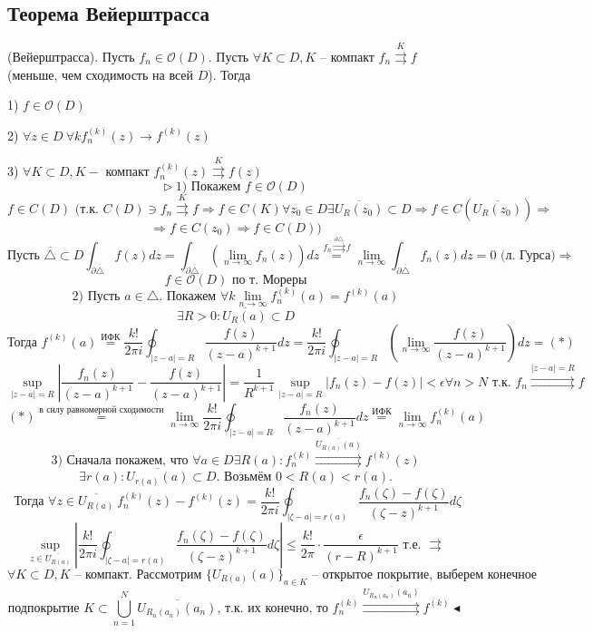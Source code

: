 \subsection{Теорема Вейерштрасса}
 (Вейерштрасса). Пусть $f_n \in \mathcal{O}(D)$. Пусть $\forall K \subset D, K$ -- компакт $f_n \overset{K}{\rightrightarrows} f$ (меньше, чем сходимость на всей $D$). Тогда

1) $f \in \mathcal{O}(D)$

2) $\forall z \in D \ \forall k f_n^{(k)}(z) \to f^{(k)}(z)$

3) $\forall K \subset D, K -$ компакт $f_n^{(k)}(z) \overset{K}{\rightrightarrows} f(z)$
\[\triangleright \ 1) \text{ Покажем } f \in \mathcal{O}(D)\]
\[f \in C(D) \text{ (т.к. $C(D) \ni f_n \overset{K}{\rightrightarrows} f \Rightarrow f \in C(K) \forall z_0 \in D \exists \overline{U_R(z_0)} \subset{D} \Rightarrow f \in C(\overline{U_R(z_0)}) \Rightarrow$}\]
\[\Rightarrow f \in C(z_0) \Rightarrow f \in C(D))\]
\[\text{Пусть } \overline{\triangle} \subset D \int_{\partial \overline{\triangle}} f(z) dz = \int_{\partial \overline{\triangle}} (\lim_{n\to\infty} f_n(z))dz \overset{f_n \overset{\partial \triangle}{\rightrightarrows} f}{=} \lim_{n\to\infty} \int_{\partial \overline{\triangle}} f_n(z) dz = 0 \text{ (л. Гурса)} \Rightarrow\]
\[f \in \mathcal{O}(D) \text{ по т. Мореры}\]
\[2) \text{ Пусть $a \in \triangle$. Покажем } \forall k \lim_{n\to\infty} f_n^{(k)}(a) = f^{(k)}(a)\]
\[\exists R > 0: \overline{U_R(a)} \subset D\]
\[\text{Тогда }f^{(k)}(a) \overset{\text{ИФК}}{=} \frac{k!}{2\pi i} \oint_{|z-a|=R} \frac{f(z)}{(z-a)^{k+1}}dz = \frac{k!}{2\pi i} \oint_{|z-a|=R} \left(\lim_{n\to\infty}\frac{f(z)}{(z-a)^{k+1}}\right)dz = (*)\]
\[\sup_{|z-a|=R} \left|\frac{f_n(z)}{(z-a)^{k+1}} - \frac{f(z)}{(z-a)^{k+1}}\right| = \frac{1}{R^{k+1}}\sup_{|z-a|=R} |f_n(z)-f(z)|<\epsilon \forall n > N \text{ т.к. } f_n \overset{|z-a|=R}{\rightrightarrows} f\]
\[(*) \overset{\text{в силу равномерной сходимости}}{=} \lim_{n\to\infty} \frac{k!}{2\pi i} \oint_{|z-a|=R} \frac{f_n(z)}{(z-a)^{k+1}}dz \overset{\text{ИФК}}{=} \lim_{n\to\infty} f_n^{(k)}(a)\]
\[3) \text{ Сначала покажем, что } \forall a \in D \exists R(a): f_n^{(k)} \overset{\overline{U_{R(a)}(a)}}{\rightrightarrows} f^{(k)}(z)\]
\[\exists r(a) : \overline{U_{r(a)}(a)} \subset D. \text{ Возьмём } 0 < R(a) < r(a).\] 
\[\text{ Тогда } \forall z \in \overline{U_{R(a)}} \ f_n^{(k)}(z) - f^{(k)}(z) = \frac{k!}{2\pi i} \oint_{|\zeta-a|=r(a)} \frac{f_n(\zeta)-f(\zeta)}{(\zeta-z)^{k+1}}d\zeta\]
\[\sup_{z \in \overline{U_{R(a)}}} \left|\frac{k!}{2\pi i}\oint_{|\zeta-a|=r(a)}\frac{f_n(\zeta)-f(\zeta)}{(\zeta - z)^{k+1}} d\zeta\right| \leq \frac{k!}{2\pi} \cdot \frac{\epsilon}{(r-R)^{k+1}} \text{ т.е. } \rightrightarrows\]
\[\forall K \subset D, K \text{ -- компакт. Рассмотрим } \{U_{R(a)}(a)\}_{a \in K} \text{ -- открытое покрытие, выберем конечное}\]
\[\text{подпокрытие } K \subset \bigcup_{n=1}^N \overline{U_{R_n(a_n)}(a_n)} \text{, т.к. их конечно, то } f_n^{(k)} \overset{\overline{U_{R_n(a_n)}(a_n)}}{\rightrightarrows} f^{(k)} \blacktriangleleft\]

